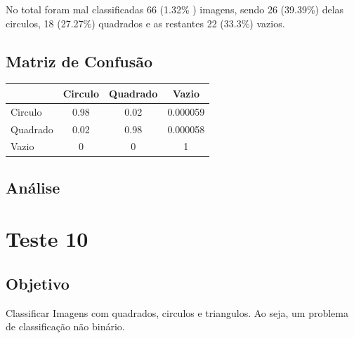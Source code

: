 No total foram mal classificadas 66 (1.32\% ) imagens, sendo 26 (39.39\%) delas circulos, 18 (27.27\%) quadrados e as restantes 22 (33.3\%) vazios. 

\subsection{Matriz de Confusão}

\begin{table}[H]
\centering
\begin{tabular}{l|c c c}
                 & Circulo & Quadrado & Vazio \\
\hline
Circulo          & 0.98       & 0.02       & 0.000059          \\
Quadrado    & 0.02       & 0.98       & 0.000058           \\
Vazio             & 0            & 0            & 1           \\
\end{tabular}
\end{table}

\subsection{Análise}

\newpage

\section{Teste 10}
\subsection{Objetivo}
    Classificar Imagens com quadrados, circulos e triangulos. Ao seja, um problema de classificação não binário.

